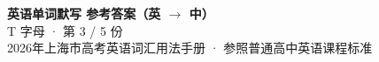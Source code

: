 \documentclass[10pt,a4paper]{article}
\begin{document}
\pagestyle{plain}

\begin{center}
{\LARGE\bfseries 英语单词默写 \quad 参考答案（英 $\to$ 中）}\\[0.22em]
{\large T 字母 · 第 3 / 5 份}\\[0.18em]
{\small 2026年上海市高考英语词汇用法手册 · 参照普通高中英语课程标准}
\end{center}

\vspace{0.2em}
\noindent{\color{rulegray}\rule{\textwidth}{0.8pt}}

\vspace{0.35em}

\vspace{0.25em}
\renewcommand{\arraystretch}{1.32}
\end{document}
